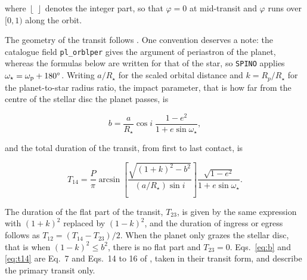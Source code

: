 where $\left\lfloor \; \right\rfloor$ denotes the integer part, so that $\varphi = 0$ at mid-transit and $\varphi$ runs over $[0,1)$ along the orbit.

The geometry of the transit follows \citet{winn2010}. One convention deserves a note: the catalogue field \texttt{pl\_orblper} gives the argument of periastron of the planet, whereas the formulas below are written for that of the star, so \texttt{SPINO} applies $\omega_\star = \omega_{\rm p} + 180^\circ$. Writing $a/R_\star$ for the scaled orbital distance and $k = R_p/R_\star$ for the planet-to-star radius ratio, the impact parameter, that is how far from the centre of the stellar disc the planet passes, is

\begin{equation}\label{eq:b}
b = \frac{a}{R_\star}\cos i \; \frac{1 - e^2}{1 + e \sin\omega_\star},
\end{equation}

and the total duration of the transit, from first to last contact, is

\begin{equation}\label{eq:t14}
T_{14} = \frac{P}{\pi} \arcsin\left[\frac{\sqrt{(1+k)^2 - b^2}}{(a/R_\star)\sin i}\right] \frac{\sqrt{1-e^2}}{1 + e\sin\omega_\star} .
\end{equation}

The duration of the flat part of the transit, $T_{23}$, is given by the same expression with $(1+k)^2$ replaced by $(1-k)^2$, and the duration of ingress or egress follows as $T_{12} = (T_{14}-T_{23})/2$. When the planet only grazes the stellar disc, that is when $(1-k)^2 \le b^2$, there is no flat part and $T_{23} = 0$. Eqs.~\ref{eq:b} and \ref{eq:t14} are Eq.~7 and Eqs.~14 to 16 of \citet{winn2010}, taken in their transit form, and describe the primary transit only.



%
